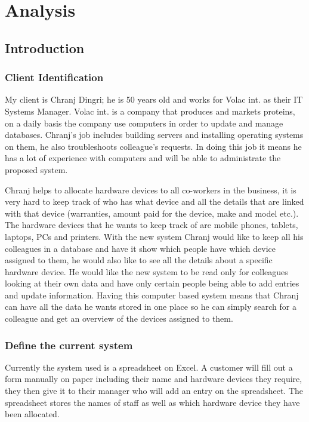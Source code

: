 \chapter{Analysis}

\section{Introduction}

\subsection{Client Identification}

My client is Chranj Dingri; he is 50 years old and works for Volac int. as their IT Systems Manager. Volac int. is a company that produces and markets proteins, on a daily basis the company use computers in order to update and manage databases. Chranj's job includes building servers and installing operating systems on them, he also troubleshoots colleague's requests. In doing this job it means he has a lot of experience with computers and will be able to administrate the proposed system.


Chranj helps to allocate hardware devices to all co-workers in the business, it is very hard to keep track of who has what device and all the details that are linked with that device (warranties, amount paid for the device, make and model etc.). The hardware devices that he wants to keep track of are mobile phones, tablets, laptops, PCs and printers. With the new system Chranj would like to keep all his colleagues in a database and have it show which people have which device assigned to them, he would also like to see all the details about a specific hardware device. He would like the new system to be read only for colleagues looking at their own data and have only certain people being able to add entries and update information. Having this computer based system means that Chranj can have all the data he wants stored in one place so he can simply search for a colleague and get an overview of the devices assigned to them. 

\subsection{Define the current system}

Currently the system used is a spreadsheet on Excel. A customer will fill out a form manually on paper including their name and hardware devices they require, they then give it to their manager who will add an entry on the spreadsheet.  The spreadsheet stores the names of staff as well as which hardware device they have been allocated. 

